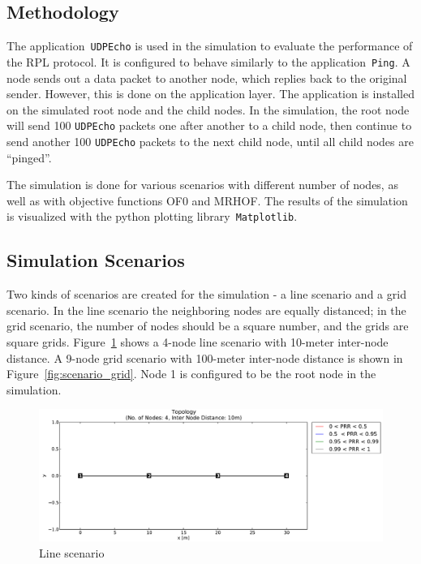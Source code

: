 \subsection{Methodology}
\label{Sim:Method}
The application~\texttt{UDPEcho} is used in the simulation to evaluate the performance of the RPL protocol. It is configured to behave similarly to the application~\texttt{Ping}. A node sends out a data packet to another node, which replies back to the original sender. However, this is done on the application layer. The application is installed on the simulated root node and the child nodes. In the simulation, the root node will send 100 \texttt{UDPEcho} packets one after another to a child node, then continue to send another 100 \texttt{UDPEcho} packets to the next child node, until all child nodes are  ``pinged''.     

The simulation is done for various scenarios with different number of nodes, as well as with objective functions OF0 and MRHOF. The results of the simulation is visualized with the python plotting library~\texttt{Matplotlib}.

\subsection{Simulation Scenarios}
\label{Sim:Scenarios}

Two kinds of scenarios are created for the simulation - a line scenario and a grid scenario. In the line scenario the neighboring nodes are equally distanced; in the grid scenario, the number of nodes should be a square number, and the grids are square grids. Figure~\ref{fig:scenario_line} shows a 4-node line scenario with 10-meter inter-node distance. A 9-node grid scenario with 100-meter inter-node distance is shown in Figure~\ref{fig:scenario_grid}. Node 1 is configured to be the root node in the simulation.

\begin{figure}[htpb]
 	\centering
    \leavevmode
      \includegraphics[scale=0.35]{Pics/results/topo4_dist10_line.pdf}
    \caption{Line scenario}
    \label{fig:scenario_line}
\end{figure}

